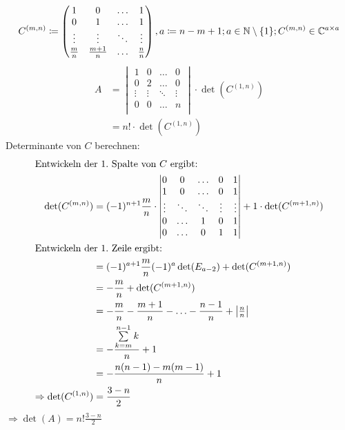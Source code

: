 \documentclass{HM}
\begin{document}
\begin{enumerate}
\begin{enumerate}
			$$C^{(m,n)}\coloneqq\begin{pmatrix}
				1&0&\hdots&1\\
				0&1&\hdots&1\\
				\vdots&\vdots&\ddots&\vdots\\
				\tfrac{m}{n}&\tfrac{m+1}{n}&\hdots&\tfrac{n}{n}
			\end{pmatrix}, a\coloneqq n-m+1; a\in\mathbb{N}\setminus\{1\}; C^{(m,n)}\in \mathbb{C}^{a\times a}$$
			\begin{align*}
				A&=\begin{vmatrix}
					1&0&\hdots&0\\
					0&2&\hdots&0\\
					\vdots&\vdots&\ddots&\vdots\\
					0&0&\hdots&n\\
				\end{vmatrix}\cdot \det(C^{(1,n)})\\
				&=n!\cdot \det(C^{(1,n)})
			\end{align*}	
			Determinante von $C$ berechnen:
			\begin{align*}
				\intertext{Entwickeln der $1.$ Spalte von $C$ ergibt:}
				\det(C^{(m,n)})&=(-1)^{n+1}\frac{m}{n}\cdot\begin{vmatrix}
					0&0&\hdots&0&1\\
					1&0&\hdots&0&1\\
					\vdots&\ddots&\ddots&\vdots&\vdots\\
					0&\hdots&1&0&1\\
					0&\hdots&0&1&1
				\end{vmatrix}+1\cdot \det(C^{(m+1,n)})\\
				\intertext{Entwickeln der $1.$ Zeile ergibt:}
				&=(-1)^{a+1}\frac{m}{n}(-1)^{a}\det(E_{a-2})+\det(C^{(m+1,n)})\\
				&=-\frac{m}{n}+\det(C^{(m+1,n)})\\
				&=-\frac{m}{n}-\frac{m+1}{n}-\hdots-\frac{n-1}{n}+\begin{vmatrix}
					\tfrac{n}{n}
				\end{vmatrix}\\
				&=-\frac{\sum\limits_{k=m}^{n-1}k}{n}+1\\
				&=-\frac{n(n-1)-m(m-1)}{n}+1\\
				\Rightarrow \det(C^{(1,n)}) &= \frac{3-n}{2}
			\end{align*}
			$\Rightarrow \det(A)=n!\frac{3-n}{2}$
			

\end{enumerate}
\end{enumerate}
\end{document}
